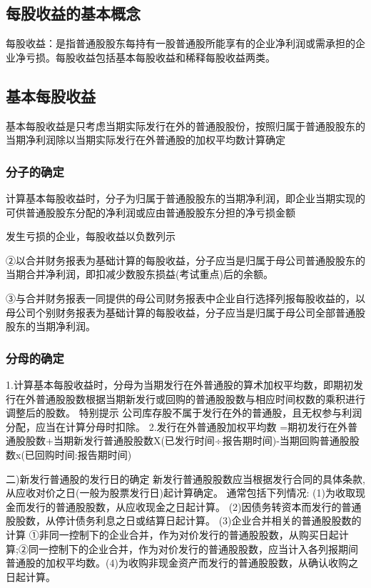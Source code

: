\documentclass[UTF8,12pt]{ctexart}
\numberwithin{equation}{section} %
\numberwithin{figure}{section}
\numberwithin{table}{section}
\begin{document}
	\subsection{每股收益的基本概念}
	每股收益：是指普通股股东每持有一股普通股所能享有的企业净利润或需承担的企业净亏损。每股收益包括基本每股收益和稀释每股收益两类。
	
	\subsection{基本每股收益}
	基本每股收益是只考虑当期实际发行在外的普通股股份，按照归属于普通股股东的当期净利润除以当期实际发行在外普通股的加权平均数计算确定
	\subsubsection{分子的确定}
	计算基本每股收益时，分子为归属于普通股股东的当期净利润，即企业当期实现的可供普通股股东分配的净利润或应由普通股股东分担的净亏损金额
	
	发生亏损的企业，每股收益以负数列示
	
	②以合并财务报表为基础计算的每股收益，分子应当是归属于母公司普通股股东的当期合并净利润，即扣减少数股东损益(考试重点)后的余额。
	
	③与合并财务报表一同提供的母公司财务报表中企业自行选择列报每股收益的，以母公司个别财务报表为基础计算的每股收益，分子应当是归属于母公司全部普通股股东的当期净利润。
	\subsubsection{分母的确定}
	1.计算基本每股收益时，分母为当期发行在外普通股的算术加权平均数，即期初发行在外普通股股数根据当期新发行或回购的普通股股数与相应时间权数的乘积进行调整后的股数。
	特别提示
	公司库存股不属于发行在外的普通股，且无权参与利润分配，应当在计算分母时扣除。
	2.发行在外普通股加权平均数
	=期初发行在外普通股股数+当期新发行普通股股数X(已发行时间÷报告期时间)-当期回购普通股股数x(已回购时间:报告期时间)
	
	二)新发行普通股的发行日的确定
	新发行普通股股数应当根据发行合同的具体条款,从应收对价之日(一般为股票发行日)起计算确定。
	通常包括下列情况:
	(1)为收取现金而发行的普通股股数，从应收现金之日起计算。
	(2)因债务转资本而发行的普通股股数，从停计债务利息之日或结算日起计算。
	(3)企业合并相关的普通股股数的计算
	①非同一控制下的企业合并，作为对价发行的普通股股数，从购买日起计算;②同一控制下的企业合并，作为对价发行的普通股股数，应当计入各列报期间普通股的加权平均数。(4)为收购非现金资产而发行的普通股股数，从确认收购之日起计算。
	
\end{document}

